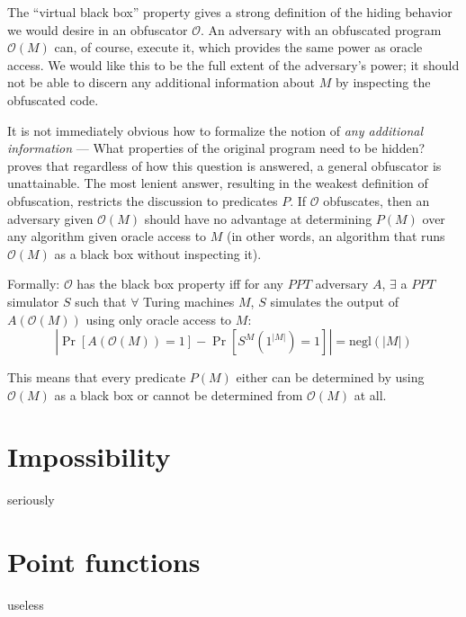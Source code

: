 \documentclass[10pt,twocolumn]{article}
\newcommand{\abs}[1]{\ensuremath{\left\vert#1\right\vert}}
\def\ppt{\textit{PPT}}
\def\obf{\ensuremath{\mathcal{O}}}
\def\negl{\text{negl}}
\begin{document}
The ``virtual black box'' property gives a strong definition of the hiding behavior we would desire
in an obfuscator $\obf$.
An adversary with an obfuscated program $\obf(M)$ can, of course, execute it, which provides the same
power as oracle access.
We would like this to be the full extent of the adversary's power; it should not be able to discern
any additional information about $M$ by inspecting the obfuscated code.

It is not immediately obvious how to formalize the notion of \textit{any additional information} ---
What properties of the original program need to be hidden?
\cite{onThe(Im)possibility} proves that regardless of how this question is answered,
a general obfuscator is unattainable.
The most lenient answer, resulting in the weakest definition of obfuscation, restricts the discussion
to predicates $P$. If $\obf$ obfuscates, then an adversary given $\obf(M)$ should have no advantage
at determining $P(M)$ over any algorithm given oracle access to $M$ (in other words, an algorithm
that runs $\obf(M)$ as a black box without inspecting it).

Formally: $\obf$ has the black box property iff for any $\ppt$ adversary $A$,
$\exists$ a $\ppt$ simulator $S$ such that
$\forall$ Turing machines $M$,
$S$ simulates the output of $A(\obf(M))$ using only oracle access to $M$:
\[ \abs{ \Pr[ A(\obf(M)) = 1 ] - \Pr[ S^M(1^\abs{M}) = 1 ] } = \negl(\abs{M}) \]

This means that every predicate $P(M)$ either can be determined by using $\obf(M)$ as a black box
or cannot be determined from $\obf(M)$ at all.
\section{Impossibility}

seriously

\section{Point functions}

useless



\end{document}

